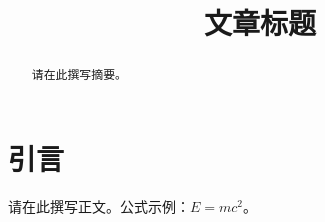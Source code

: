 \documentclass[UTF8,fontset=fandol]{ctexart}
\title{文章标题}
\date{}
\begin{document}
\maketitle
\begin{abstract}
请在此撰写摘要。
\end{abstract}
\section{引言}
请在此撰写正文。公式示例：$E=mc^2$。
\end{document}
